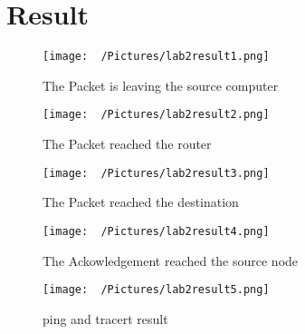 \documentclass{article}
\begin{document}
\section{Result}
\begin{figure}[H]
    \centering
    \texttt{[image: ~/Pictures/lab2result1.png]}
    \caption{The Packet is leaving the source computer}
\end{figure}
\begin{figure}[H]
    \centering
    \texttt{[image: ~/Pictures/lab2result2.png]}
    \caption{The Packet reached the router}
\end{figure}
\begin{figure}[H]
    \centering
    \texttt{[image: ~/Pictures/lab2result3.png]}
    \caption{The Packet reached the destination}
\end{figure}
\begin{figure}[H]
    \centering
    \texttt{[image: ~/Pictures/lab2result4.png]}
    \caption{The Ackowledgement reached the source node}
\end{figure}
\begin{figure}[H]
    \centering
    \texttt{[image: ~/Pictures/lab2result5.png]}
    \caption{ping and tracert result}
\end{figure}
\end{document}
